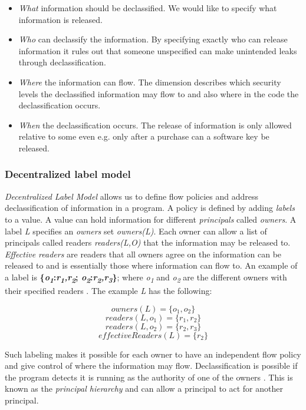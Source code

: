 \begin{itemize}
	\item \emph{What} information should be declassified. We would like to specify what information is released.
	\item \emph{Who} can declassify the information. By specifying exactly who can release information it rules out that someone unspecified can make unintended leaks through declassification.
	\item \emph{Where} the information can flow. The dimension describes which security levels the declassified information may flow to and also where in the code the declassification occurs. 
	\item \emph{When} the declassification occurs. The release of information is only allowed relative to some even e.g. only after a purchase can a software key be released.
\end{itemize}



\subsubsection{Decentralized label model}\label{dlm}
\emph{Decentralized Label Model} allows us to define flow policies and address declassification of information in a program. A policy is defined by adding \emph{labels} to a value. A value can hold information for different \emph{principals} called \emph{owners}. A label \emph{L} specifies an \emph{owners} set \emph{owners(L)}. Each owner can allow a list of principals called readers \emph{readers(L,O)} that the information may be released to. \emph{Effective readers} are readers that all owners agree on the information can be released to and is essentially those where information can flow to. An example of a label is \textbf{\{\emph{o\textsubscript{1}}:\emph{r\textsubscript{1},r\textsubscript{2}}; \emph{o\textsubscript{2}}:\emph{r\textsubscript{2},r\textsubscript{3}}\}}; where  \emph{o\textsubscript{1}} and \emph{o\textsubscript{2}} are the different owners with their specified readers \cite{Myers1997}. The example \emph{L} has the following:

\[owners(L) = \{o_1, o_2\}\]
\[readers(L,o_1) = \{r_1, r_2\} \]
\[readers(L,o_2) = \{r_2, r_3\} \]
\[effectiveReaders(L) = \{r_2\} \]

Such labeling makes it possible for each owner to have an independent flow policy and give control of where the information may flow. Declassification is possible if the program detects it is running as the authority of one of the owners \cite{Myers1997} \cite{Myers1998}. This is known as the \emph{principal hierarchy} and can allow a principal to act for another principal.

